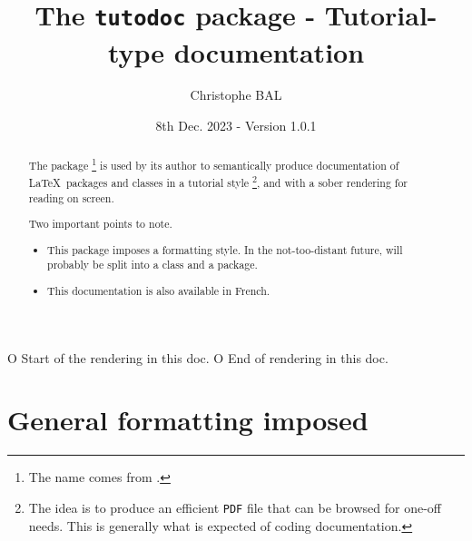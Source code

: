 
                       { O{ Start of the rendering in this doc. }
                         O{ End of rendering in this doc. } }{
        \nopagebreak\smallskip\nopagebreak
}{
        \nopagebreak\smallskip\nopagebreak
}





\title{The \texttt{tutodoc} package - Tutorial-type documentation}
\author{Christophe BAL}
\date{8th Dec. 2023 - Version 1.0.1}

\maketitle

\begin{abstract}
\noindent
The  package
\footnote{
    The name comes from .
}
is used by its author to semantically produce documentation of \LaTeX\ packages and classes in a tutorial style
\footnote{
    The idea is to produce an efficient \texttt{PDF} file that can be browsed for one-off needs. This is generally what is expected of coding documentation.
},
and with a sober rendering for reading on screen.

\medskip

\noindent
Two important points to note.
\begin{itemize}
    \item This package imposes a formatting style. In the not-too-distant future,  will probably be split into a class and a package.

    \item This documentation is also available in French.
\end{itemize}
\end{abstract}


\newpage
\tableofcontents
\newpage
\section{General formatting imposed}

